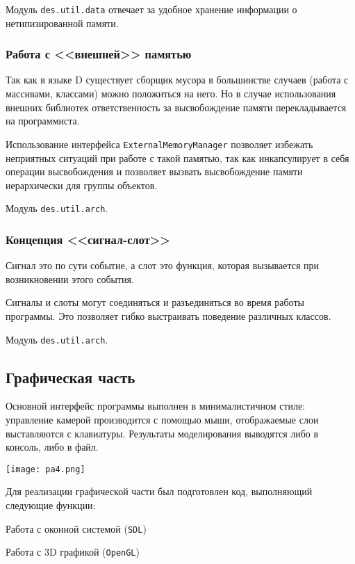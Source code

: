 Модуль \verb|des.util.data| отвечает за удобное хранение информации о
нетипизированной памяти.

\subsubsection{Работа с <<внешней>> памятью}

Так как в языке D существует сборщик мусора в большинстве случаев (работа с массивами, классами)
можно положиться на него. Но в случае использования внешних библиотек ответственность за 
высвобождение памяти перекладывается на программиста.

Использование интерфейса \verb|ExternalMemoryManager| позволяет избежать неприятных ситуаций
при работе с такой памятью, так как инкапсулирует в себя операции высвобождения и позволяет
вызвать высвобождение памяти иерархически для группы объектов.

Модуль \verb|des.util.arch|.

\subsubsection{Концепция <<сигнал-слот>>}

Сигнал это по сути событие, а слот это функция, которая вызывается при
возникновении этого события.

Сигналы и слоты могут соединяться и разъединяться во время работы программы.
Это позволяет гибко выстраивать поведение различных классов.

Модуль \verb|des.util.arch|.

\newpage
\subsection{Графическая часть}

Основной интерфейс программы выполнен в минималистичном стиле:
управление камерой производится с помощью мыши, отображаемые слои выставляются с клавиатуры.
Результаты моделирования выводятся либо в консоль, либо в файл.

\vspace{1em}

\texttt{[image: pa4.png]}

Для реализации графической части был подготовлен код, выполняющий следующие функции:

\begin{mintemize}
\item Работа с оконной системой (\verb|SDL|)
\item Работа с 3D графикой (\verb|OpenGL|)
\end{mintemize}

